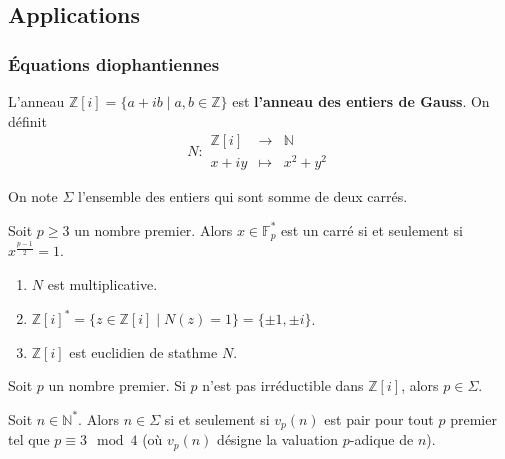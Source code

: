 	\subsection{Applications}

	\subsubsection{Équations diophantiennes}


	\begin{definition}
		L'anneau $\mathbb{Z}[i] = \{ a + ib \mid a, b \in \mathbb{Z} \}$ est \textbf{l'anneau des entiers de Gauss}. On définit
		\[
			N :
			\begin{array}{ccc}
				\mathbb{Z}[i] &\rightarrow& \mathbb{N} \\
				x+iy &\mapsto& x^2 + y^2
			\end{array}
		\]
	\end{definition}


	\begin{notation}
		On note $\Sigma$ l'ensemble des entiers qui sont somme de deux carrés.
	\end{notation}

	\begin{lemma}
		Soit $p \geq 3$ un nombre premier. Alors $x \in \mathbb{F}^*_p$ est un carré si et seulement si $x^{\frac{p-1}{2}} = 1$.
	\end{lemma}

	\begin{lemma}
		\begin{enumerate}[label=(\roman*)]
			\item $N$ est multiplicative.
			\item $\mathbb{Z}[i]^* = \{ z \in \mathbb{Z}[i] \mid N(z) = 1 \} = \{ \pm 1, \pm i \}$.
			\item $\mathbb{Z}[i]$ est euclidien de stathme $N$.
		\end{enumerate}
	\end{lemma}

	\begin{lemma}
		Soit $p$ un nombre premier. Si $p$ n'est pas irréductible dans $\mathbb{Z}[i]$, alors $p \in \Sigma$.
	\end{lemma}


	\begin{theorem}
		Soit $n \in \mathbb{N}^*$. Alors $n \in \Sigma$ si et seulement si $v_p(n)$ est pair pour tout $p$ premier tel que $p \equiv 3 \mod 4$ (où $v_p(n)$ désigne la valuation $p$-adique de $n$).
	\end{theorem}

